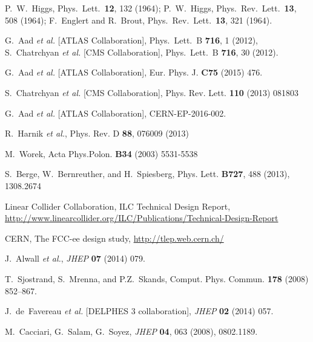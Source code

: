 \documentclass[preprintnumbers,nofootinbib,noshowpacs,eqsecnum,prd,superscriptaddress,letterpaper]{revtex4}
\begin{document}
\begin{thebibliography}{99}

 P.~W.~Higgs,
  Phys.\ Lett.\  {\bf 12}, 132 (1964);
 P.~W.~Higgs,
  Phys.\ Rev.\ Lett.\  {\bf 13}, 508 (1964);
 F.~Englert and R.~Brout,
  Phys.\ Rev.\ Lett.\  {\bf 13}, 321 (1964).

  G.~Aad {\it et al.} [ATLAS Collaboration],
  Phys.\ Lett.\ B {\bf 716}, 1 (2012),
  S.~Chatrchyan {\it et al.}  [CMS Collaboration],
  Phys.\ Lett.\ B {\bf 716}, 30 (2012).
  
  G.~Aad {\it et al.} [ATLAS Collaboration],
  Eur. Phys. J. {\bf C75} (2015) 476.
  
  S.~Chatrchyan {\it et al.}  [CMS Collaboration],
  Phys. Rev. Lett. {\bf 110} (2013) 081803
  
  G.~Aad {\it et al.} [ATLAS Collaboration],
  	CERN-EP-2016-002.
  
  R.~Harnik {\it et al.},
  Phys. Rev. D {\bf 88}, 076009 (2013)
  
  M.~Worek,
  Acta Phys.Polon. {\bf B34} (2003) 5531-5538
  
  S.~Berge, W.~Bernreuther, and H.~Spiesberg,
  Phys. Lett. {\bf B727}, 488 (2013), 1308.2674
  
  Linear Collider Collaboration, ILC Technical Design Report, \url{http://www.linearcollider.org/ILC/Publications/Technical-Design-Report}
  
  CERN, The FCC-ee design study, \url{http://tlep.web.cern.ch/}
  
  J.~Alwall {\it et al.},
  {\it JHEP} {\bf 07} (2014) 079.
  
  T.~Sjostrand, S.~Mrenna, and P.Z.~Skands,
  Comput. Phys. Commun. {\bf 178} (2008) 852–867.
 
  J.~de~Favereau {\it et al.} [DELPHES 3 collaboration],
  {\it JHEP} {\bf 02} (2014) 057.
  
  M.~Cacciari, G.~Salam, G.~Soyez,
  {\it JHEP} {\bf 04}, 063 (2008), 0802.1189.
  
\end{thebibliography}
\end{document}
